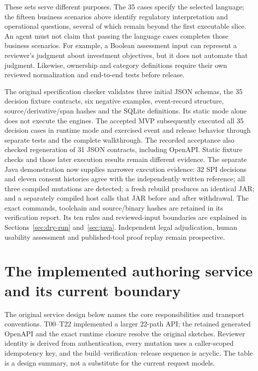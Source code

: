 \documentclass[12pt,a4paper,oneside,openany]{book}
\begin{document}
These sets serve different purposes. The 35 cases specify the selected language;
the fifteen business scenarios above identify regulatory interpretation and
operational questions, several of which remain beyond the first executable
slice. An agent must not claim that passing the language cases completes those
business scenarios. For example, a Boolean assessment input can represent a
reviewer's judgment about investment objectives, but it does not automate that
judgment. Likewise, ownership and category definitions require their own reviewed
normalization and end-to-end tests before release.

The original specification checker validates three initial JSON schemas,
the 35 decision fixture contracts, six negative examples, event-record structure,
source/derivative/span hashes and the SQLite definitions. Its static mode alone
does not execute the engines. The accepted MVP subsequently executed all 35
decision cases in runtime mode and exercised event and release behavior through
separate tests and the complete walkthrough. The recorded acceptance also checked
regeneration of 31 JSON contracts, including OpenAPI. Static fixture checks and
those later execution results remain different evidence. The separate Java
demonstration now supplies narrower execution evidence: 32 SPI decisions and eleven
consent histories agree with the independently written reference; all three
compiled mutations are detected; a fresh rebuild produces an identical JAR;
and a separately compiled host calls that JAR before and after withdrawal.
The exact commands, toolchain and source/binary hashes are retained in its
verification report. Its ten rules and reviewed-input boundaries are explained
in Sections~\ref{sec:dry-run} and~\ref{sec:java}. Independent legal adjudication,
human usability assessment and published-tool proof replay remain prospective.

\section{The implemented authoring service and its current boundary}

The original service design below names the core responsibilities and transport
conventions. T00--T22 implemented a larger 22-path API; the retained generated
OpenAPI and the exact runtime closure resolve the original sketches. Reviewer
identity is derived from authentication, every mutation uses a caller-scoped
idempotency key, and the build--verification--release sequence is acyclic.
The table is a design summary, not a substitute for the current request models.
\end{document}
